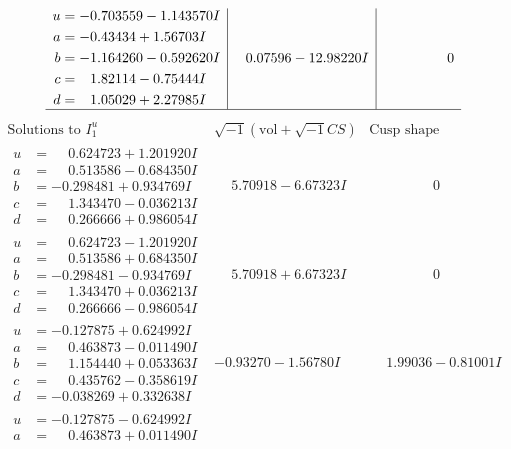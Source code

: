 \documentclass[1p]{elsarticle_modified}
\theoremstyle{definition}
\newcommand{\I}{\sqrt{-1}}
\begin{document}
$$\begin{array}{c|c|c}
\begin{aligned}
u &= -0.703559 - 1.143570 I \\
a &= -0.43434 + 1.56703 I \\
b &= -1.164260 - 0.592620 I \\
c &= \phantom{-}1.82114 - 0.75444 I \\
d &= \phantom{-}1.05029 + 2.27985 I\end{aligned}
 & \phantom{-}0.07596 - 12.98220 I & \phantom{-0.000000 } 0\\
 \hline 
 \end{array}$$\newpage$$\begin{array}{c|c|c}  
\text{Solutions to }I^u_{1}& \I (\text{vol} + \sqrt{-1}CS) & \text{Cusp shape}\\
 \hline 
\begin{aligned}
u &= \phantom{-}0.624723 + 1.201920 I \\
a &= \phantom{-}0.513586 - 0.684350 I \\
b &= -0.298481 + 0.934769 I \\
c &= \phantom{-}1.343470 - 0.036213 I \\
d &= \phantom{-}0.266666 + 0.986054 I\end{aligned}
 & \phantom{-}5.70918 - 6.67323 I & \phantom{-0.000000 } 0 \\ \hline\begin{aligned}
u &= \phantom{-}0.624723 - 1.201920 I \\
a &= \phantom{-}0.513586 + 0.684350 I \\
b &= -0.298481 - 0.934769 I \\
c &= \phantom{-}1.343470 + 0.036213 I \\
d &= \phantom{-}0.266666 - 0.986054 I\end{aligned}
 & \phantom{-}5.70918 + 6.67323 I & \phantom{-0.000000 } 0 \\ \hline\begin{aligned}
u &= -0.127875 + 0.624992 I \\
a &= \phantom{-}0.463873 - 0.011490 I \\
b &= \phantom{-}1.154440 + 0.053363 I \\
c &= \phantom{-}0.435762 - 0.358619 I \\
d &= -0.038269 + 0.332638 I\end{aligned}
 & -0.93270 - 1.56780 I & \phantom{-}1.99036 - 0.81001 I \\ \hline\begin{aligned}
u &= -0.127875 - 0.624992 I \\
a &= \phantom{-}0.463873 + 0.011490 I \\

\end{aligned}
\end{array}$$
\end{document}

